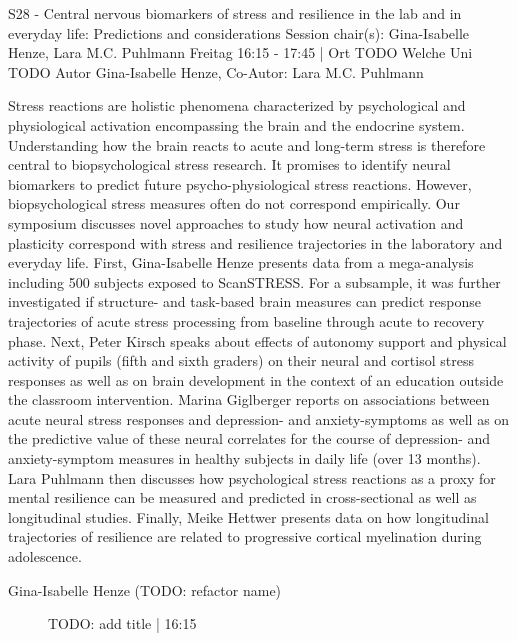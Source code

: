 
            \begin{symposium}
            {S28 - Central nervous biomarkers of stress and resilience in the lab and in everyday life: Predictions and considerations }
            {Session chair(s): Gina-Isabelle Henze, Lara M.C. Puhlmann}
            {Freitag 16:15 - 17:45 | Ort TODO}
            {Welche Uni TODO}
            Autor Gina-Isabelle Henze, Co-Autor: Lara M.C. Puhlmann

Stress reactions are holistic phenomena characterized by psychological and physiological activation encompassing the brain and the endocrine system. Understanding how the brain reacts to acute and long-term stress is therefore central to biopsychological stress research. It promises to identify neural biomarkers to predict future psycho-physiological stress reactions. However, biopsychological stress measures often do not correspond empirically. Our symposium discusses novel approaches to study how neural activation and plasticity correspond with stress and resilience trajectories in the laboratory and everyday life.
First, Gina-Isabelle Henze presents data from a mega-analysis including 500 subjects exposed to ScanSTRESS. For a subsample, it was further investigated if structure- and task-based brain measures can predict response trajectories of acute stress processing from baseline through acute to recovery phase.
Next, Peter Kirsch speaks about effects of autonomy support and physical activity of pupils (fifth and sixth graders) on their neural and cortisol stress responses as well as on brain development in the context of an education outside the classroom intervention.
Marina Giglberger reports on associations between acute neural stress responses and depression- and anxiety-symptoms as well as on the predictive value of these neural correlates for the course of depression- and anxiety-symptom measures in healthy subjects in daily life (over 13 months).
Lara Puhlmann then discusses how psychological stress reactions as a proxy for mental resilience can be measured and predicted in cross-sectional as well as longitudinal studies.
Finally, Meike Hettwer presents data on how longitudinal trajectories of resilience are related to progressive cortical myelination during adolescence.
            \begin{description}    
            
                \item [Gina-Isabelle Henze (TODO: refactor name)] TODO: add title \textcolor{mygray}{ | 16:15}    
                

\end{description}
\end{symposium}
